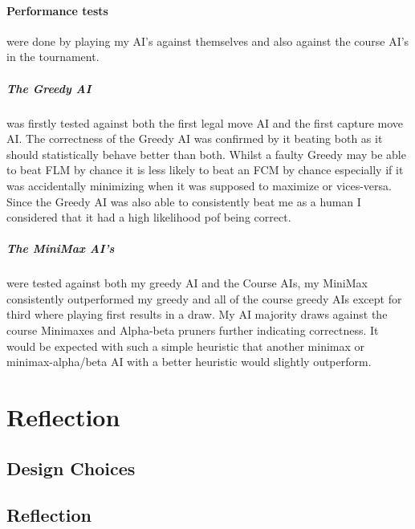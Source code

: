 \documentclass[11pt]{article}
\begin{document}
\paragraph{Performance tests} were done by playing my AI's against themselves and also against the course AI's in the tournament.

\subparagraph{The Greedy AI} was firstly tested against both the first legal move AI and the first capture move AI. The correctness of the Greedy AI was confirmed by it beating both as it should statistically behave better than both. Whilst a faulty Greedy may be able to beat FLM by chance it is less likely to beat an FCM by chance especially if it was accidentally minimizing when it was supposed to maximize or vices-versa. Since the Greedy AI was also able to consistently beat me as a human I considered that it had a high likelihood pof being correct.

\subparagraph{The MiniMax AI's} were tested against both my greedy AI and the Course AIs, my MiniMax consistently outperformed my greedy and all of the course greedy AIs except for third where playing first results in a draw. My AI majority draws against the course Minimaxes and Alpha-beta pruners further indicating correctness. It would be expected with such a simple heuristic that another minimax or minimax-alpha/beta AI with a better heuristic would slightly outperform. 





\section{Reflection}
    \subsection{Design Choices}


   \subsection{Reflection}







\end{document}
